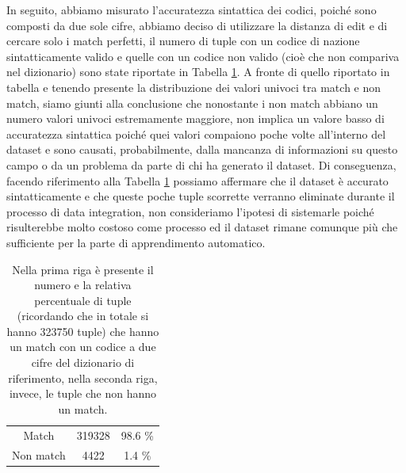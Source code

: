 In seguito, abbiamo misurato l'accuratezza sintattica dei codici, poiché sono composti da due sole cifre, abbiamo deciso di utilizzare la distanza di edit e di cercare solo i match perfetti, il numero di tuple con un codice di nazione sintatticamente valido e quelle con un codice non valido (cioè che non compariva nel dizionario) sono state riportate in Tabella \ref{tab:code_country_compl}.
A fronte di quello riportato in tabella e tenendo presente la distribuzione dei valori univoci tra match e non match, siamo giunti alla conclusione che nonostante i non match abbiano un numero valori univoci estremamente maggiore, non implica un valore basso di accuratezza sintattica poiché quei valori compaiono poche volte all'interno del dataset e sono causati, probabilmente, dalla mancanza di informazioni su questo campo o da un problema da parte di chi ha generato il dataset. 
Di conseguenza, facendo riferimento alla Tabella \ref{tab:code_country_compl} possiamo affermare che il dataset è accurato sintatticamente e che queste poche tuple scorrette verranno eliminate durante il processo di data integration, non consideriamo l'ipotesi di sistemarle poiché risulterebbe molto costoso come processo ed il dataset rimane comunque più che sufficiente per la parte di apprendimento automatico.

\begin{table}
	\caption{Nella prima riga è presente il numero e la relativa percentuale di tuple (ricordando che in totale si hanno 323750 tuple) che hanno un match con un codice a due cifre del dizionario di riferimento, nella seconda riga, invece, le tuple che non hanno un match.}
	
	\label{tab:code_country_compl}
	
	\centering
	\begin{tabular}{c|cc}
		Match & 319328 & 98.6 \% \\ 
		Non match & 4422 & 1.4 \% \\
	\end{tabular}
\end{table} 




